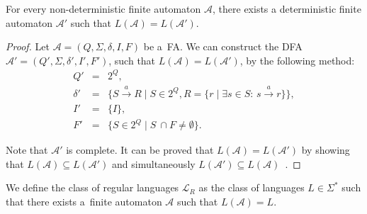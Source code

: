 	\begin{lemma}
For every non-deterministic finite automaton $\mathcal{A}$, there exists a
deterministic finite automaton $\mathcal{A}'$ such that $L(\mathcal{A}) =
L(\mathcal{A}')$.
	\end{lemma}
	
	\begin{proof}
	Let $\mathcal{A} = (Q, \Sigma, \delta, I, F)$ be a~FA. We can construct
	the DFA $\mathcal{A}'= (Q', \Sigma, \delta', I', F')$, such that
	$L(\mathcal{A}) = L(\mathcal{A}')$, by the following method:
	\begin{eqnarray*}
	 Q' & = & 2^Q,\\
	 \delta' & = & \{S \overset{a}{\longrightarrow} R \mid S \in 2^Q, R = \{r \mid
	 \exists s \in S:\,s \overset{a}{\longrightarrow} r\}\},\\
	 I' & = & \{I\},\\
	 F' & = & \{S \in 2^Q \mid S~\cap F \neq \emptyset\}.
	\end{eqnarray*}
	
	Note that $\mathcal{A}'$ is complete. It can be proved that $L(\mathcal{A}) =
	L(\mathcal{A}')$ by showing that $L(\mathcal{A}) \subseteq L(\mathcal{A}')$ and simultaneously $L(\mathcal{A}')
	\subseteq L(\mathcal{A})$~\cite{tin}.
	\end{proof}
	
	\begin{defz}
We define the class of regular languages $\mathcal{L}_R$ as the class of
languages $L \in \Sigma^*$ such that there exists a~finite automaton
$\mathcal{A}$ such that $L(\mathcal{A}) = L$.
	\end{defz}
	
